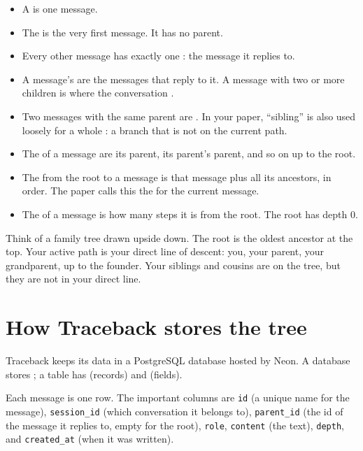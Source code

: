 \begin{itemize}
\item A  is one message.
\item The  is the very first message. It has no parent.
\item Every other message has exactly one : the message it replies to.
\item A message's  are the messages that reply to it. A message with two or more children is where the conversation .
\item Two messages with the same parent are . In your paper, ``sibling'' is also used loosely for a whole : a branch that is not on the current path.
\item The  of a message are its parent, its parent's parent, and so on up to the root.
\item The  from the root to a message is that message plus all its ancestors, in order. The paper calls this the  for the current message.
\item The  of a message is how many steps it is from the root. The root has depth 0.
\end{itemize}

\begin{plain}
Think of a family tree drawn upside down. The root is the oldest ancestor at the top. Your active path is your direct line of descent: you, your parent, your grandparent, up to the founder. Your siblings and cousins are on the tree, but they are not in your direct line.
\end{plain}

\section{How Traceback stores the tree}

 Traceback keeps its data in a PostgreSQL database hosted by Neon. A database stores ; a table has  (records) and  (fields).

 Each message is one row. The important columns are \texttt{id} (a unique name for the message), \texttt{session\_id} (which conversation it belongs to), \texttt{parent\_id} (the id of the message it replies to, empty for the root), \texttt{role}, \texttt{content} (the text), \texttt{depth}, and \texttt{created\_at} (when it was written).

